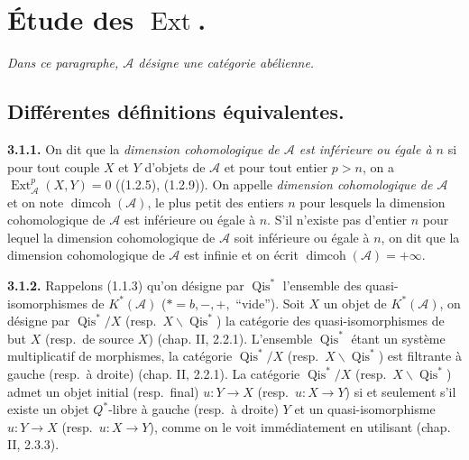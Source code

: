\clearpage
{}%
\begingroup\small\setlength{\parskip}{0pt}\setlength{\emergencystretch}{1.5em}
\setlength{\abovedisplayskip}{4pt plus 2pt minus 2pt}%
\setlength{\belowdisplayskip}{4pt plus 2pt minus 2pt}%

\section{Étude des \texorpdfstring{$\operatorname{Ext}$}{Ext}.}

\noindent\textit{Dans ce paragraphe, $\mathcal A$ désigne une catégorie
abélienne.}

\subsection{Différentes définitions équivalentes.}

\noindent\textbf{3.1.1.}\quad
On dit que la \emph{dimension cohomologique de $\mathcal A$ est inférieure
ou égale à $n$} si pour tout couple $X$ et $Y$ d'objets de $\mathcal A$ et
pour tout entier $p>n$, on a
$\operatorname{Ext}_{\mathcal A}^{p}(X,Y)=0$ ((1.2.5), (1.2.9)). On appelle
\emph{dimension cohomologique de $\mathcal A$} et on note
$\operatorname{dimcoh}(\mathcal A)$, le plus petit des entiers $n$ pour
lesquels la dimension cohomologique de $\mathcal A$ est inférieure ou égale
à $n$. S'il n'existe pas d'entier $n$ pour lequel la dimension cohomologique
de $\mathcal A$ soit inférieure ou égale à $n$, on dit que la dimension
cohomologique de $\mathcal A$ est infinie et on écrit
$\operatorname{dimcoh}(\mathcal A)=+\infty$.

\noindent\textbf{3.1.2.}\quad
Rappelons (1.1.3) qu'on désigne par $\operatorname{Qis}^{*}$ l'ensemble des
quasi-isomorphismes de $K^{*}(\mathcal A)$
($*=b,-,+,{}$ ``vide''). Soit $X$ un objet de $K^{*}(\mathcal A)$, on
désigne par $\operatorname{Qis}^{*}/X$ (resp.\
$X\backslash\operatorname{Qis}^{*}$) la catégorie des quasi-isomorphismes de
but $X$ (resp.\ de source $X$) (chap. II, 2.2.1). L'ensemble
$\operatorname{Qis}^{*}$ étant un système multiplicatif de morphismes, la
catégorie $\operatorname{Qis}^{*}/X$ (resp.\
$X\backslash\operatorname{Qis}^{*}$) est filtrante à gauche (resp.\ à droite)
(chap. II, 2.2.1). La catégorie $\operatorname{Qis}^{*}/X$ (resp.\
$X\backslash\operatorname{Qis}^{*}$) admet un objet initial (resp.\ final)
$u\colon Y\longrightarrow X$ (resp.\ $u\colon X\longrightarrow Y$) si et
seulement s'il existe un objet $Q^{*}$-libre à gauche (resp.\ à droite) $Y$ et
un quasi-isomorphisme $u\colon Y\longrightarrow X$ (resp.\
$u\colon X\longrightarrow Y$), comme on le voit immédiatement en utilisant
(chap. II, 2.3.3).

